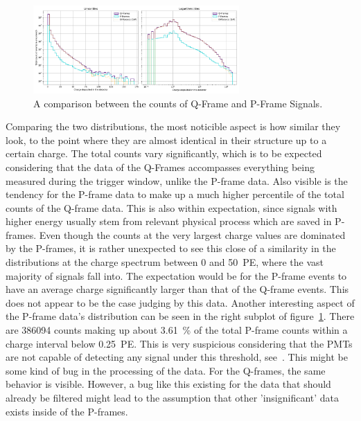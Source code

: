 \begin{figure}
    \centering
    \includegraphics[width=0.7\textwidth]{Plots/q_p_comp.pdf}
    \caption{A comparison between the counts of Q-Frame and P-Frame Signals.}
    \label{fig:frt_mu_sub_comp}
\end{figure}


Comparing the two distributions, the most noticible aspect is how similar they look, to the point where they are almost identical in their structure up to a 
certain charge. The total counts vary significantly, which is to be expected considering that the data of the Q-Frames accompasses everything being measured during the 
trigger window, unlike the P-frame data. Also visible is the tendency for the P-frame data to make up a much higher percentile of the total counts of the Q-frame data.
This is also within 
expectation, since signals with higher energy usually stem from relevant physical process which are saved in P-frames. Even though the counts at the very largest 
charge values are dominated by the P-frames, it is rather unexpected to see this close of a similarity in the distributions at the charge spectrum between
\num{0} and \num{50}~\unit{PE}, where the vast majority of signals fall into. The expectation would be for the P-frame events to have an average charge significantly
larger than that of the Q-frame events. This does not appear to be the case judging by this data. Another interesting aspect of the P-frame data's distribution can be 
seen in the right subplot of figure~\ref{fig:frt_mu_sub_comp}. There are \num{386094} counts making up about \SI{3.61}{\percent} of the total P-frame counts within 
a charge interval below \num{0.25}~\unit{PE}. This is very suspicious considering that the PMTs are not capable of detecting any signal under this threshold,
see~\cite{einstein}. This might be some kind of bug in the processing of the data. For the Q-frames, the same behavior is visible. However, a bug like this 
existing for the data that should already be filtered might lead to the assumption that other 'insignificant' data exists inside of the P-frames. 


